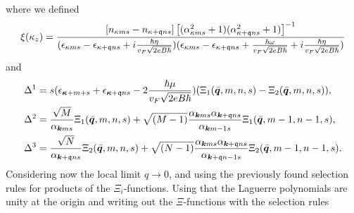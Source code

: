 where we defined
\begin{equation}
  \xi(\kappa_z) = \frac{[n_{\kappa ms} - n_{\kappa + \mathfrak{q} ns}]
  \left[ (\alpha _{\kappa ms}^2 + 1) (\alpha _{\kappa +\mathfrak{q} ns}^2 + 1) \right]^{-1}
  }{
    (\epsilon _{\kappa m s} - \epsilon _{\kappa +\mathfrak{q}ns} + i \frac{\hbar  \eta }{v_F\sqrt{2 e B \hbar }})
    (\epsilon _{\kappa m s} - \epsilon _{\kappa +\mathfrak{q}ns} + \frac{\hbar \omega }{v_F \sqrt{2 e B \hbar }} + i \frac{\hbar  \eta }{v_F\sqrt{2 e B \hbar }})
  }
\end{equation}
and
\begin{align}
  \Delta ^1 &= s (\epsilon _{\bm{\kappa} + m + s} + \epsilon _{\bm{\kappa} + \mathfrak{\bm{q}} ns} - 2 \frac{\hbar \mu }{v_F \sqrt{2eB\hbar }}) (\Xi _1(\bar{\bm{q}}, m, n, s) - \Xi _2 (\bar{\bm{q}}, m, n, s)),\\
  \Delta ^2 &= 
              \frac{\sqrt{M}}{\alpha _{\bm{k} m s} }
              \Xi_1(\bar{\bm{q}}, m, n, s)
              +
              \sqrt{(M-1)}
              \frac{\alpha _{\bm{k} m s} \alpha _{\bm{k} + \mathfrak{q} n s}}{\alpha _{\bm{k} m-1 s}}
              \Xi_1(\bar{\bm{q}}, m-1, n -1, s),\\
  \Delta^3 &= 
             \frac{\sqrt{ N} }{\alpha _{\bm{k} + \mathfrak{q} n s}}
             \Xi _2(\bar{\bm{q}}, m, n, s)
             +
             \sqrt{(N-1)}
             \frac{\alpha _{\bm{k} m s} \alpha _{\bm{k} + \mathfrak{q} n s}}{\alpha _{\bm{k} + \mathfrak{q} n-1 s}}
             \Xi _2(\bar{\bm{q}}, m-1, n-1, s).
\end{align}
Considering now the local limit $q\to 0$, and using the previously found selection rules for products of the $\Xi _i$-functions.
Using that the Laguerre polynomials are unity at the origin and writing out the $\Xi $-functions with the selection rules
